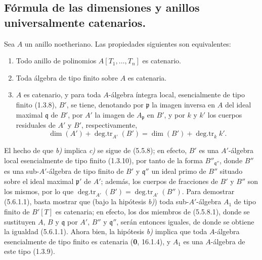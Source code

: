 \subsection{Fórmula de las dimensiones y anillos universalmente catenarios.}
\label{IV.2.s5.6-fr}

\begin{proposition}[5.6.1]
Sea $A$ un anillo noetheriano. Las propiedades siguientes son equivalentes:
\begin{enumerate}
\item[\textup{a)}] Todo anillo de polinomios $A[T_1,\ldots,T_n]$ es catenario.
\item[\textup{b)}] Toda álgebra de tipo finito sobre $A$ es catenaria.
\item[\textup{c)}] $A$ es catenario, y para toda $A$-álgebra íntegra local,
esencialmente de tipo finito \textup{(1.3.8)}, $B'$, se tiene, denotando por
$\mathfrak p$ la imagen inversa en $A$ del ideal maximal $\mathfrak q$ de
$B'$, por $A'$ la imagen de $A_{\mathfrak p}$ en $B'$, y por $k$ y $k'$ los
cuerpos residuales de $A'$ y $B'$, respectivamente,
\begin{equation}
\dim(A')+\operatorname{deg.tr}_{A'}(B')
=\dim(B')+\operatorname{deg.tr}_k k'.
\tag{5.6.1.1}\label{IV.2.s5.6.1.1-fr}
\end{equation}
\end{enumerate}
\end{proposition}

El hecho de que \emph{b)} implica \emph{c)} se sigue de (5.5.8); en efecto, $B'$ es una
$A'$-álgebra local esencialmente de tipo finito (1.3.10), por tanto de la
forma $B''_{\mathfrak q''}$, donde $B''$ es una sub-$A'$-álgebra de tipo
finito de $B'$ y $\mathfrak q''$ un ideal primo de $B''$ situado sobre el
ideal maximal $\mathfrak p'$ de $A'$; además, los cuerpos de fracciones de
$B'$ y $B''$ son los mismos, por lo que
$\operatorname{deg.tr}_{A'}(B')=\operatorname{deg.tr}_{A'}(B'')$.
Para demostrar (5.6.1.1), basta mostrar que (bajo la hipótesis \emph{b)}) toda
sub-$A'$-álgebra $A_1$ de tipo finito de $B'[T]$ es catenaria; en efecto, los
dos miembros de (5.5.8.1), donde se sustituyen $A$, $B$ y $\mathfrak q$ por
$A'$, $B''$ y $\mathfrak q''$, serán entonces iguales, de donde se obtiene la
igualdad (5.6.1.1). Ahora bien, la hipótesis \emph{b)} implica que toda $A$-álgebra
esencialmente de tipo finito es catenaria (\textbf 0, 16.1.4), y $A_1$ es una
$A$-álgebra de este tipo (1.3.9).

